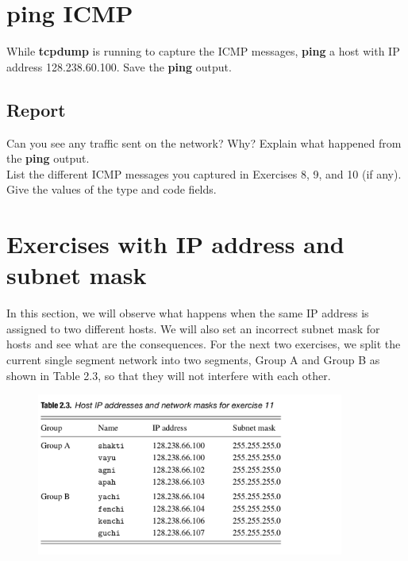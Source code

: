 \documentclass[10pt,a4paper]{article}
\numberwithin{equation}{section}
\numberwithin{figure}{section}
\numberwithin{table}{section}
\begin{document}
\section{ping ICMP}
    While \textbf{tcpdump} is running to capture the ICMP messages, \textbf{ping} a host with IP address 128.238.60.100. Save the \textbf{ping} output.
    \subsection*{Report}
    Can you see any traffic sent on the network? Why? Explain what happened from the \textbf{ping} output. \\
    List the different ICMP messages you captured in Exercises 8, 9, and 10 (if any). Give the values of the type and code fields.

\section*{Exercises with IP address and subnet mask}
    In this section, we will observe what happens when the same IP address is assigned to two different hosts.
    We will also set an incorrect subnet mask for hosts and see what are the consequences.
    For the next two exercises, we split the current single segment network into two segments, Group A and Group B as shown in Table 2.3, so that they will not interfere with each other.
    \begin{figure}[H]
        \centering
        \includegraphics[width=0.9\textwidth]{img/table2-3.png}
    \end{figure}
\end{document}
